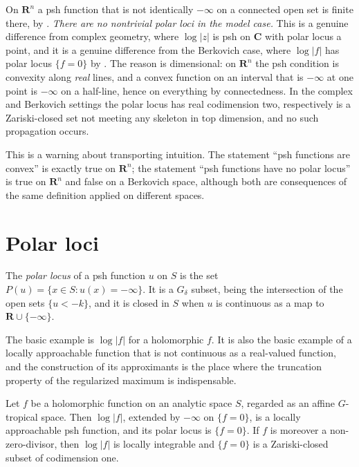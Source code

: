 \begin{example}
\label{ex:ch15-convex-polar}
On $\mathbf R^n$ a psh function that is not identically $-\infty$ on a
connected open set is finite there, by
.  \emph{There are no nontrivial polar loci in
the model case.}  This is a genuine difference from complex geometry, where
$\log|z|$ is psh on $\mathbf C$ with polar locus a point, and it is a genuine
difference from the Berkovich case, where $\log|f|$ has polar locus
$\{f=0\}$ by .  The reason is dimensional:
on $\mathbf R^n$ the psh condition is convexity along \emph{real} lines, and
a convex function on an interval that is $-\infty$ at one point is
$-\infty$ on a half-line, hence on everything by connectedness.  In the
complex and Berkovich settings the polar locus has real codimension two,
respectively is a Zariski-closed set not meeting any skeleton in top
dimension, and no such propagation occurs.

This is a warning about transporting intuition.  The statement
``psh functions are convex'' is exactly true on $\mathbf R^n$; the statement
``psh functions have no polar locus'' is true on $\mathbf R^n$ and false on
a Berkovich space, although both are consequences of the same definition
applied on different spaces.
\end{example}

\section{Polar loci}
\label{sec:ch15-polar}

\begin{definition}
\label{def:ch15-polar}
The \emph{polar locus} of a psh function $u$ on $S$ is the set
$P(u)=\{x\in S:u(x)=-\infty\}$.  It is a $G_\delta$ subset, being the
intersection of the open sets $\{u<-k\}$, and it is closed in $S$ when $u$ is
continuous as a map to $\mathbf R\cup\{-\infty\}$.
\end{definition}

The basic example is $\log|f|$ for a holomorphic $f$.  It is also the basic
example of a locally approachable function that is not continuous as a
real-valued function, and the construction of its approximants is the place
where the truncation property of the regularized maximum is indispensable.

\begin{proposition}
\label{prop:ch15-log-approachable}
Let $f$ be a holomorphic function on an analytic space $S$, regarded as an
affine $G$-tropical space.  Then $\log|f|$, extended by $-\infty$ on
$\{f=0\}$, is a locally approachable psh function, and its polar locus is
$\{f=0\}$.  If $f$ is moreover a non-zero-divisor, then $\log|f|$ is locally
integrable and $\{f=0\}$ is a Zariski-closed subset of codimension one.
\end{proposition}

